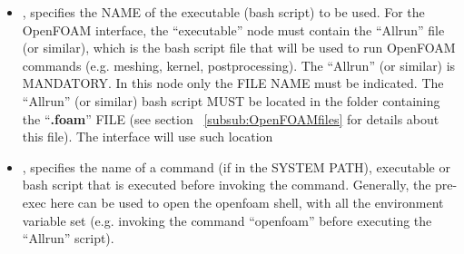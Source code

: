\subnodesIntro
%
\begin{itemize}
  \item {},  specifies the NAME
  of the executable (bash script) to be used. For the OpenFOAM interface, the ``executable'' node must contain the ``Allrun'' file (or similar), which is the bash script file
  that will be used to run OpenFOAM commands (e.g. meshing, kernel, postprocessing). The ``Allrun'' (or similar) is MANDATORY.
  \nb In this node only the FILE NAME must be indicated. The ``Allrun'' (or similar) bash script MUST be located in the folder containing the ``\textbf{.foam}'' FILE (see section ~\ref{subsub:OpenFOAMfiles} for details about this file). The interface will use such location 
   \item {},  specifies the name of a command (if in the SYSTEM PATH), executable or bash script that is executed before invoking the  command. 
                                                    Generally, the pre-exec here can be used to open the openfoam shell, with all the environment variable set (e.g. invoking the command ``openfoam'' before executing the ``Allrun'' script).


\end{itemize}
